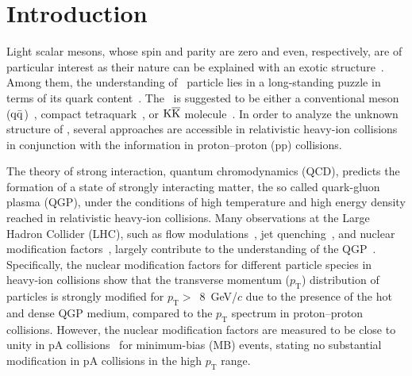 
\section{Introduction}

Light scalar mesons, whose spin and parity are zero and even, respectively, are of particular interest as their nature can be explained with an exotic structure~\cite{ParticleDataGroup:2022pth}. Among them, the understanding of \fzero\ particle lies in a long-standing puzzle in terms of its quark content~\cite{ExHIC:2010gcb, Jaffe:1976ig, Maiani:2004uc}. The \fzero\ is suggested to be either a conventional meson ($\rm{}q\bar{q}$)~\cite{Chen:2003za}, compact tetraquark~\cite{Achasov:2020aun}, or $\rm{}K\overline{K}$ molecule~\cite{Ahmed:2020kmp}. In order to analyze the unknown structure of \fzero, several approaches are accessible in relativistic heavy-ion collisions in conjunction with the information in proton--proton (pp) collisions. 

The theory of strong interaction, quantum chromodynamics (QCD), predicts the formation of a state of strongly interacting matter, the so called quark-gluon plasma (QGP), under the conditions of high temperature and high energy density reached in relativistic heavy-ion collisions. Many observations at the Large Hadron Collider (LHC), such as flow modulations~\cite{Bhalerao:2020ulk, ALICE:2019zfl}, jet quenching~\cite{ALICE:2019qyj}, and nuclear modification factors~\cite{ALICE:2019hno}, largely contribute to the understanding of the QGP~\cite{Heinz:2000bk, ALICE:2022wpn}. Specifically, the nuclear modification factors for different particle species in heavy-ion collisions show that the transverse momentum ($p_{\mathrm{T}}$) distribution of particles is strongly modified for $p_{\mathrm{T}}>$~8~GeV/$c$ due to the presence of the hot and dense QGP medium, compared to the $p_{\mathrm{T}}$ spectrum in proton--proton collisions. However, the nuclear modification factors are measured to be close to unity in pA collisions~\cite{ALICE:2016dei} for minimum-bias (MB) events, stating no substantial modification in pA collisions in the high $p_{\mathrm{T}}$ range. 

